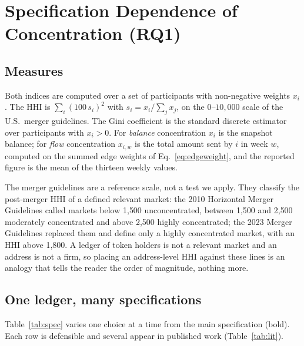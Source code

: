 \section{Specification Dependence of Concentration (RQ1)}
\label{sec:spec}

\subsection{Measures}
\label{sec:measures}
Both indices are computed over a set of participants with non-negative
weights $x_i$. The HHI is $\sum_i (100\,s_i)^2$ with $s_i = x_i/\sum_j x_j$,
on the $0$--$10{,}000$ scale of the U.S.\ merger guidelines. The Gini
coefficient is the standard discrete estimator over participants with
$x_i > 0$. For \emph{balance} concentration $x_i$ is the snapshot balance; for
\emph{flow} concentration $x_{i,w}$ is the total amount sent by $i$ in week
$w$, computed on the summed edge weights of Eq.~\eqref{eq:edgeweight}, and the
reported figure is the mean of the thirteen weekly values.

The merger guidelines are a reference scale, not a test we apply. They
classify the post-merger HHI of a defined relevant market: the 2010
Horizontal Merger Guidelines \cite{doj2010horizontal} called markets below
1{,}500 unconcentrated, between 1{,}500 and 2{,}500 moderately concentrated
and above 2{,}500 highly concentrated; the 2023 Merger Guidelines
\cite{doj2023merger} replaced them and define only a highly concentrated
market, with an HHI above 1{,}800. A ledger of token holders is not a
relevant market and an address is not a firm, so placing an address-level
HHI against these lines is an analogy that tells the reader the order of
magnitude, nothing more.

\subsection{One ledger, many specifications}
\label{sec:grid}
Table~\ref{tab:spec} varies one choice at a time from the main specification
(bold). Each row is defensible and several appear in published work
(Table~\ref{tab:lit}).

